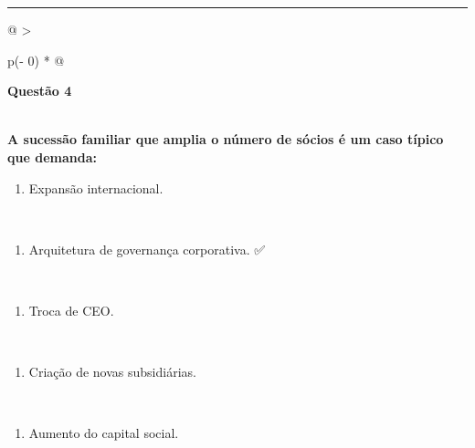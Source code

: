 \documentclass[
]{book}
\providecommand{\tightlist}{%
  \setlength{\itemsep}{0pt}\setlength{\parskip}{0pt}}
\begin{document}
\begin{center}\rule{0.5\linewidth}{0.5pt}\end{center}

\begin{longtable}[]{@{}
  >{\raggedright\arraybackslash}p{(\columnwidth - 0\tabcolsep) * }@{}}
\toprule\noalign{}
\begin{minipage}[b]{\linewidth}\raggedright
\textbf{Questão 4}
\end{minipage} \\
\midrule\noalign{}
\endhead
\bottomrule\noalign{}
\endlastfoot
\textbf{A sucessão familiar que amplia o número de sócios é um caso típico que demanda:} \\
\begin{minipage}[t]{\linewidth}\raggedright
\begin{enumerate}
\def\labelenumi{\alph{enumi})}
\tightlist
\item
  Expansão internacional.
\end{enumerate}
\end{minipage} \\
\begin{minipage}[t]{\linewidth}\raggedright
\begin{enumerate}
\def\labelenumi{\alph{enumi})}
\setcounter{enumi}{1}
\tightlist
\item
  Arquitetura de governança corporativa. ✅
\end{enumerate}
\end{minipage} \\
\begin{minipage}[t]{\linewidth}\raggedright
\begin{enumerate}
\def\labelenumi{\alph{enumi})}
\setcounter{enumi}{2}
\tightlist
\item
  Troca de CEO.
\end{enumerate}
\end{minipage} \\
\begin{minipage}[t]{\linewidth}\raggedright
\begin{enumerate}
\def\labelenumi{\alph{enumi})}
\setcounter{enumi}{3}
\tightlist
\item
  Criação de novas subsidiárias.
\end{enumerate}
\end{minipage} \\
\begin{minipage}[t]{\linewidth}\raggedright
\begin{enumerate}
\def\labelenumi{\alph{enumi})}
\setcounter{enumi}{4}
\tightlist
\item
  Aumento do capital social.
\end{enumerate}
\end{minipage} \\
\end{longtable}
\end{document}
